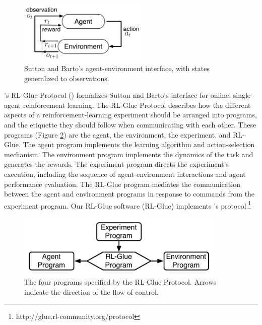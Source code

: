 \documentclass[twoside,11pt]{article}
\begin{document}
\vspace{-0.4cm}
\begin{figure}[ht]
\begin{center}
\includegraphics[height=3cm]{figures/agent-env.pdf}
\vspace{-0.4cm}
\caption{\small Sutton and Barto's agent-environment interface, with states generalized to observations.}
\label{fig:agent-env}
\end{center}
\vspace{-0.7cm}
\end{figure}


\citeauthor{whiteThesis}'s RL-Glue Protocol (\citeyear{whiteThesis}) formalizes Sutton and Barto's interface for online, single-agent reinforcement learning.  The RL-Glue Protocol describes how the different aspects of a reinforcement-learning experiment should be arranged into programs, and the etiquette they should follow when communicating with each other. These programs (Figure \ref{fig:RLDIA}) are the agent, the environment, the experiment, and RL-Glue.  The agent program implements the learning algorithm and action-selection mechanism. The environment program implements the dynamics of the task and generates the rewards. The experiment program directs the experiment's execution, including the sequence of agent-environment interactions and agent performance evaluation.  The RL-Glue program mediates the communication between the agent and environment programs in response to commands from the experiment program. Our RL-Glue software (RL-Glue) implements \citeauthor{whiteThesis}'s protocol.\footnote{http://glue.rl-community.org/protocol} 

\vspace{-0.4cm}
\begin{figure}[ht]
\begin{center}
\includegraphics[height=3cm]{figures/glue.pdf}
\vspace{-0.4cm}
\caption{\small The four programs specified by the RL-Glue Protocol.  Arrows indicate the direction of the flow of control.}
\label{fig:RLDIA}
\end{center}
\vspace{-0.7cm}
\end{figure}
\end{document}
